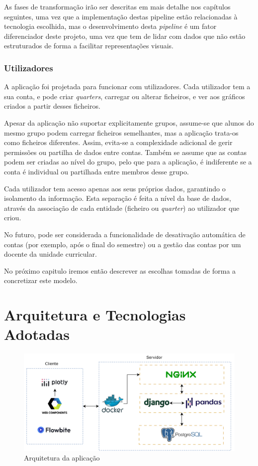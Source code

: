 As fases de transformação irão ser descritas em mais detalhe nos capítulos seguintes, uma vez que a implementação destas pipeline estão relacionadas à tecnologia escolhida, mas o desenvolvimento desta \textit{pipeline} é um fator diferenciador deste projeto, uma vez que tem de lidar com dados que não estão estruturados de forma a facilitar representações visuais. 

\subsubsection{Utilizadores}

A aplicação foi projetada para funcionar com utilizadores. Cada utilizador tem a sua conta, e pode criar \textit{quarters}, carregar ou alterar ficheiros, e ver aos gráficos criados a partir desses ficheiros.

Apesar da aplicação não suportar explicitamente grupos, assume-se que alunos do mesmo grupo podem carregar ficheiros semelhantes, mas a aplicação trata-os como ficheiros diferentes. Assim, evita-se a complexidade adicional de gerir permissões ou partilha de dados entre contas.  Também se assume que as contas podem ser criadas ao nível do grupo, pelo que para a aplicação, é indiferente se a conta é individual ou partilhada entre membros desse grupo.

Cada utilizador tem acesso apenas aos seus próprios dados, garantindo o isolamento da informação. Esta separação é feita a nível da base de dados, através da associação de cada entidade (ficheiro ou \textit{quarter}) ao utilizador que criou.

No futuro, pode ser considerada a funcionalidade de desativação automática de contas (por exemplo, após o final do semestre) ou a gestão das contas por um docente da unidade curricular.

No próximo capitulo iremos então descrever as escolhas tomadas de forma a concretizar este modelo.

\section{Arquitetura e Tecnologias Adotadas}
\label{sec:tec}

\begin{figure}[h]
\centering
\includegraphics[max width=\textwidth]{./img/arch}
\caption{Arquitetura da aplicação}
\label{fig:arquitectura}
\end{figure}

